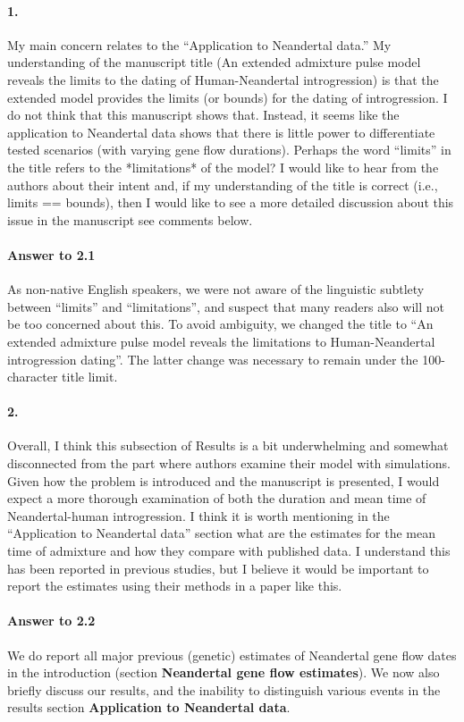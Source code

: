 \documentclass[11pt]{article}
\let\oldparagraph\paragraph
\renewcommand{\paragraph}[1]{\oldparagraph{#1}\mbox{}}
\begin{document}
\paragraph{1.}
My main concern relates to the “Application to Neandertal data.” My understanding of the manuscript title (An extended admixture pulse model reveals the limits to the dating of Human-Neandertal introgression) is that the extended model provides the limits (or bounds) for the dating of introgression. I do not think that this manuscript shows that. Instead, it seems like the application to Neandertal data shows that there is little power to differentiate tested scenarios (with varying gene flow durations). Perhaps the word “limits” in the title refers to the *limitations* of the model? I would like to hear from the authors about their intent and, if my understanding of the title is correct (i.e., limits == bounds), then I would like to see a more detailed discussion about this issue in the manuscript see comments below.

\paragraph{Answer to 2.1}
As non-native English speakers, we were not aware of the linguistic subtlety between ``limits'' and  ``limitations'', and suspect that many readers also will not be too concerned about this. To avoid ambiguity, we changed the title to ``An extended admixture pulse model reveals the limitations to Human-Neandertal introgression dating''. The latter change was necessary to remain under the 100-character title limit.

\paragraph{2.}
Overall, I think this subsection of Results is a bit underwhelming and somewhat disconnected from the part where authors examine their model with simulations. Given how the problem is introduced and the manuscript is presented, I would expect a more thorough examination of both the duration and mean time of Neandertal-human introgression. I think it is worth mentioning in the “Application to Neandertal data” section what are the estimates for the mean time of admixture and how they compare with published data. I understand this has been reported in previous studies, but I believe it would be important to report the estimates using their methods in a paper like this.

\paragraph{Answer to 2.2}
We do report all major previous (genetic) estimates of Neandertal gene flow dates in the introduction (section \textbf{Neandertal gene flow estimates}). We now also briefly discuss our results, and the inability to distinguish various events in the results section \textbf{Application to Neandertal data}.
\end{document}
